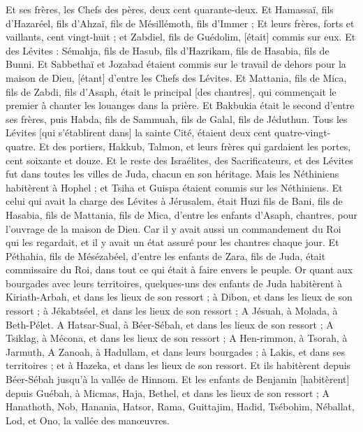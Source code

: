\begin{multicols}{2}
Et ses frères, les Chefs des pères, deux cent quarante-deux. Et Hamassaï, fils d'Hazaréel, fils d'Ahzaï, fils de Mésillémoth, fils d'Immer ;
Et leurs frères, forts et vaillants, cent vingt-huit ; et Zabdiel, fils de Guédolim, [était] commis sur eux.
Et des Lévites : Sémahja, fils de Hasub, fils d'Hazrikam, fils de Hasabia, fils de Bunni.
Et Sabbethaï et Jozabad étaient commis sur le travail de dehors pour la maison de Dieu, [étant] d'entre les Chefs des Lévites.
Et Mattania, fils de Mica, fils de Zabdi, fils d'Asaph, était le principal [des chantres], qui commençait le premier à chanter les louanges dans la prière. Et Bakbukia était le second d'entre ses frères, puis Habda, fils de Sammuah, fils de Galal, fils de Jéduthun.
Tous les Lévites [qui s'établirent dans] la sainte Cité, étaient deux cent quatre-vingt-quatre.
Et des portiers, Hakkub, Talmon, et leurs frères qui gardaient les portes, cent soixante et douze.
Et le reste des Israélites, des Sacrificateurs, et des Lévites fut dans toutes les villes de Juda, chacun en son héritage.
Mais les Néthiniens habitèrent à Hophel ; et Tsiha et Guispa étaient commis sur les Néthiniens.
Et celui qui avait la charge des Lévites à Jérusalem, était Huzi fils de Bani, fils de Hasabia, fils de Mattania, fils de Mica, d'entre les enfants d'Asaph, chantres, pour l'ouvrage de la maison de Dieu.
Car il y avait aussi un commandement du Roi qui les regardait, et il y avait un état assuré pour les chantres chaque jour.
Et Péthahia, fils de Mésézabéel, d'entre les enfants de Zara, fils de Juda, était commissaire du Roi, dans tout ce qui était à faire envers le peuple.
Or quant aux bourgades avec leurs territoires, quelques-uns des enfants de Juda habitèrent à Kiriath-Arbah, et dans les lieux de son ressort ; à Dibon, et dans les lieux de son ressort ; à Jékabtséel, et dans les lieux de son ressort ;
A Jésuah, à Molada, à Beth-Pélet.
A Hatsar-Sual, à Béer-Sébah, et dans les lieux de son ressort ;
A Tsiklag, à Mécona, et dans les lieux de son ressort ;
A Hen-rimmon, à Tsorah, à Jarmuth,
A Zanoah, à Hadullam, et dans leurs bourgades ; à Lakis, et dans ses territoires ; et à Hazeka, et dans les lieux de son ressort. Et ils habitèrent depuis Béer-Sébah jusqu'à la vallée de Hinnom.
Et les enfants de Benjamin [habitèrent] depuis Guébah, à Micmas, Haja, Bethel, et dans les lieux de son ressort ;
A Hanathoth, Nob, Hanania,
Hatsor, Rama, Guittajim,
Hadid, Tsébohim, Néballat,
Lod, et Ono, la vallée des manœuvres.

\end{multicols}
